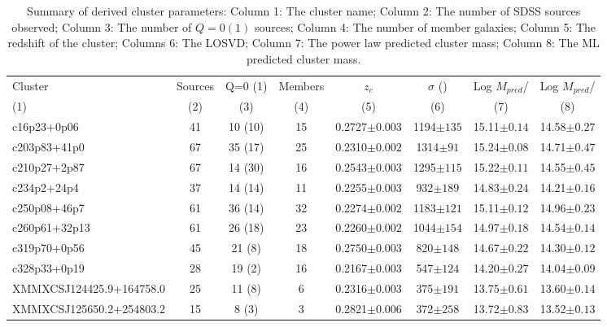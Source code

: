 \begin{landscape}
	\begin{table}
		\centering 
		\caption{Summary of derived cluster parameters: Column 1: The cluster name; Column 2: The number of SDSS sources observed; Column 3: The number of $Q=0(1)$ sources; Column 4: The number of member galaxies; Column 5: The redshift of the cluster; Columns 6: The LOSVD; Column 7: The power law predicted cluster mass; Column 8: The ML predicted cluster mass.} 
		\begin{tabular}
			{lccccccc} \hline Cluster & Sources & Q=0 (1) & Members & $z_{c}$ & $\sigma$ (\kms) & Log $M_{pred}$/\Msol & Log $M_{pred}$/\Msol \\
			(1) & (2) & (3) & (4) & (5) & (6) & (7) & (8) \\
			\hline \hline 
			c16p23+0p06 & 41 & 10 (10) & 15 & 0.2727$\pm{0.003}$ & 1194$\pm{135}$ & 15.11$\pm{0.14}$ & 14.58$\pm{0.27}$ \\
			c203p83+41p0 & 67 & 35 (17) & 25 & 0.2310$\pm{0.002}$ & 1314$\pm{91}$ & 15.24$\pm{0.08}$ & 14.71$\pm{0.47}$ \\
			c210p27+2p87 & 67 & 14 (30) & 16 & 0.2543$\pm{0.003}$ & 1295$\pm{115}$ & 15.22$\pm{0.11}$ & 14.55$\pm{0.45}$ \\
			c234p2+24p4 & 37 & 14 (14) & 11 & 0.2255$\pm{0.003}$ & 932$\pm{189}$ & 14.83$\pm{0.24}$ & 14.21$\pm{0.16}$ \\
			c250p08+46p7 & 61 & 36 (14) & 32 & 0.2274$\pm{0.002}$ & 1183$\pm{121}$ & 15.11$\pm{0.12}$ & 14.96$\pm{0.23}$ \\
			c260p61+32p13 & 61 & 26 (18) & 23 & 0.2260$\pm{0.002}$ & 1044$\pm{154}$ & 14.97$\pm{0.18}$ & 14.54$\pm{0.14}$ \\
			c319p70+0p56 & 45 & 21 (8) & 18 & 0.2750$\pm{0.003}$ & 820$\pm{148}$ & 14.67$\pm{0.22}$ & 14.30$\pm{0.12}$ \\
			c328p33+0p19 & 28 & 19 (2) & 16 & 0.2167$\pm{0.003}$ & 547$\pm{124}$ & 14.20$\pm{0.27}$ & 14.04$\pm{0.09}$ \\
			XMMXCSJ124425.9+164758.0 & 25 & 11 (8) & 6 & 0.2316$\pm{0.003}$ & 375$\pm{191}$ & 13.75$\pm{0.61}$ & 13.60$\pm{0.14}$ \\
			XMMXCSJ125650.2+254803.2 & 15 & 8 (3) & 3 & 0.2821$\pm{0.006}$ & 372$\pm{258}$ & 13.72$\pm{0.83}$ & 13.52$\pm{0.13}$ \\
			\hline 
		\end{tabular}
		\label{2tbl: derived parameters} 
	\end{table}
\end{landscape}


